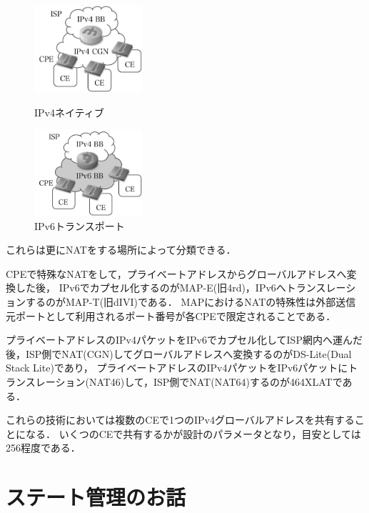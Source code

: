 \begin{figure}[htbp]
 \begin{minipage}{0.5\hsize}
  \begin{center}
   \includegraphics[bb=0 0 175 140,width=40mm]{./yuyarin/cgn.pdf}
  \end{center}
  \caption{IPv4ネイティブ}
  \label{fig:one}
 \end{minipage}
 \begin{minipage}{0.5\hsize}
  \begin{center}
   \includegraphics[bb=0 0 175 140,width=40mm]{./yuyarin/v6transport.pdf}
  \end{center}
  \caption{IPv6トランスポート}
  \label{fig:two}
 \end{minipage}
\end{figure}

これらは更にNATをする場所によって分類できる．

CPEで特殊なNATをして，プライベートアドレスからグローバルアドレスへ変換した後，
IPv6でカプセル化するのがMAP-E(旧4rd)，IPv6へトランスレーションするのがMAP-T(旧dIVI)である．
MAPにおけるNATの特殊性は外部送信元ポートとして利用されるポート番号が各CPEで限定されることである．

プライベートアドレスのIPv4パケットをIPv6でカプセル化してISP網内へ運んだ後，ISP側でNAT(CGN)してグローバルアドレスへ変換するのがDS-Lite(Dual Stack Lite)であり，
プライベートアドレスのIPv4パケットをIPv6パケットにトランスレーション(NAT46)して，ISP側でNAT(NAT64)するのが464XLATである．

これらの技術においては複数のCEで1つのIPv4グローバルアドレスを共有することになる．
いくつのCEで共有するかが設計のパラメータとなり，目安としては256程度である．

\section{ステート管理のお話}

